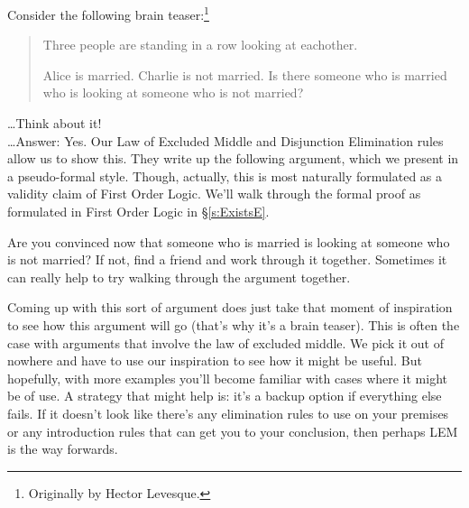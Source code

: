 Consider the following brain teaser:\footnote{Originally by Hector Levesque.}
\begin{quote}
Three people are standing in a row looking at eachother. 
\begin{center}
\end{center}
Alice is married. Charlie is not married. Is there someone who is married who is looking at someone who is not married?
\end{quote} \ldots Think about it! \\\ldots Answer: Yes. 
Our Law of Excluded Middle and Disjunction Elimination rules allow us to show this. They write up the following argument, which we present in a pseudo-formal style. Though, actually, this is most naturally formulated as a validity claim of First Order Logic. We'll walk through the formal proof as formulated in First Order Logic in  \S\ref{s:ExistsE}.
\begin{pf}
	\LEM
	\open
	\close
	\open
	\close
\end{pf}Are you convinced now that someone who is married is looking at someone who is not married? If not, find a friend and work through it together. Sometimes it can really help to try walking through the argument together.
\label{s:orE}

Coming up with this sort of argument does just take that moment of inspiration to see how this argument will go (that's why it's a brain teaser). This is often the case with arguments that involve the law of excluded middle. We pick it out of nowhere and have to use our inspiration to see how it might be useful. But hopefully, with more examples you'll become familiar with cases where it might be of use. A strategy that might help is: it's a backup option if everything else fails. If it doesn't look like there's any elimination rules to use on your premises or any introduction rules that can get you to your conclusion, then perhaps LEM is the way forwards. 

